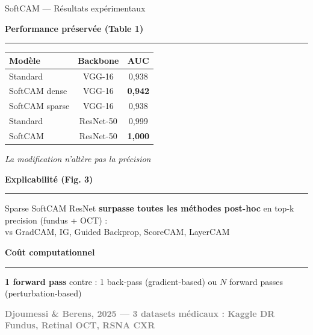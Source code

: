 \documentclass[10pt]{beamer}
\newcommand{\source}[1]{\vspace{6pt}\hfill{\textcolor{gray}{\textbf{\tiny #1}}}}
\begin{document}
\begin{frame}{SoftCAM --- Résultats expérimentaux}
	\begin{minipage}{0.52\textwidth}
		\textbf{Performance préservée (Table 1)}
		\rule{\linewidth}{0.5pt}
		\vspace{2pt}
		
		{\small
			\begin{tabular}{lcc}
				\toprule
				\textbf{Modèle} & \textbf{Backbone} & \textbf{AUC} \\
				\midrule
				Standard & VGG-16 & 0,938 \\
				SoftCAM dense & VGG-16 & \textbf{0,942} \\
				SoftCAM sparse & VGG-16 & 0,938 \\
				Standard & ResNet-50 & 0,999 \\
				SoftCAM & ResNet-50 & \textbf{1,000} \\
				\bottomrule
		\end{tabular}}
		
		\vspace{4pt}
		{\small \textit{La modification n'altère pas la précision}}
	\end{minipage}
	\hfill
	\begin{minipage}{0.44\textwidth}
		\vspace{-1.05cm}
		\textbf{Explicabilité (Fig. 3)}
		\rule{\linewidth}{0.5pt}
		\vspace{2pt}
		
		{\footnotesize
			Sparse SoftCAM ResNet \textbf{surpasse toutes les méthodes post-hoc}
			en top-k precision (fundus + OCT) : \\
			vs GradCAM, IG, Guided Backprop, ScoreCAM, LayerCAM}
	\end{minipage}
	
	\vspace{14pt}
	
	\textbf{Coût computationnel}
	\rule{\linewidth}{0.5pt}
	
	{\footnotesize
		\textbf{1 forward pass} contre : 1 back-pass (gradient-based) ou $N$ forward passes (perturbation-based)}
	
	\vspace{4pt}
	\source{Djoumessi \& Berens, 2025 --- 3 datasets médicaux : Kaggle DR Fundus, Retinal OCT, RSNA CXR}
\end{frame}
\end{document}
